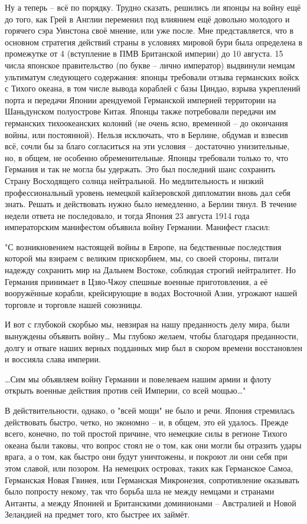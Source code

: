 Ну а теперь – всё по порядку. Трудно сказать, решились ли японцы на войну ещё до того, как Грей в Англии переменил под влиянием ещё довольно молодого и горячего сэра Уинстона своё мнение, или уже после. Мне представляется, что в основном стратегия действий страны в условиях мировой бури была определена в промежутке от 4 (вступление в ПМВ Британской империи) до 10 августа. 15 числа японское правительство (по букве – лично император) выдвинули немцам ультиматум следующего содержания: японцы требовали отзыва германских войск с Тихого океана, в том числе вывода кораблей с базы Циндао, взрыва укреплений порта и передачи Японии арендуемой Германской империей территории на Шаньдунском полуострове Китая. Японцы также потребовали передачи им германских тихоокеанских колоний (не очень ясно, временной – до окончания войны, или постоянной). Нельзя исключать, что в Берлине, обдумав и взвесив всё, сочли бы за благо согласиться на эти условия – достаточно унизительные, но, в общем, не особенно обременительные. Японцы требовали только то, что Германия и так не могла бы удержать. Это был последний шанс сохранить Страну Восходящего солнца нейтральной. Но медлительность и низкий профессиональный уровень немецкой кайзеровской дипломатии вновь дал себя знать. Решать и действовать нужно было немедленно, а Берлин тянул. В течение недели ответа не последовало, и тогда Япония 23 августа 1914 года императорским манифестом объявила войну Германии. Манифест гласил:

"С возникновением настоящей войны в Европе, на бедственные последствия которой мы взираем с великим прискорбием, мы, со своей стороны, питали надежду сохранить мир на Дальнем Востоке, соблюдая строгий нейтралитет. Но Германия принимает в Цзяо-Чжоу спешные военные приготовления, а её вооружённые корабли, крейсирующие в водах Восточной Азии, угрожают нашей торговле и торговле нашей союзницы.

И вот с глубокой скорбью мы, невзирая на нашу преданность делу мира, были вынуждены объявить войну… Мы глубоко желаем, чтобы благодаря преданности, долгу и отваге наших верных подданных мир был в скором времени восстановлен и воссияла слава империи.

…Сим мы объявляем войну Германии и повелеваем нашим армии и флоту открыть военные действия против сей Империи, со всей мощью…"

В действительности, однако, о "всей мощи" не было и речи. Япония стремилась действовать быстро, четко, но экономно – и, в общем, это ей удалось. Прежде всего, конечно, по той простой причине, что немецкие силы в регионе Тихого океана были таковы, что вопрос стоял не о том, как они могли бы отразить удары врага, а о том, как быстро они будут уничтожены, и покроют ли они себя при этом славой, или позором. На немецких островах, таких как Германское Самоа, Германская Новая Гвинея, или Германская Микронезия, сопротивление оказывать было попросту некому, так что борьба шла не между немцами и странами Антанты, а между Японией и Британскими доминионами – Австралией и Новой Зеландией на предмет того, кто быстрее их займёт. 

